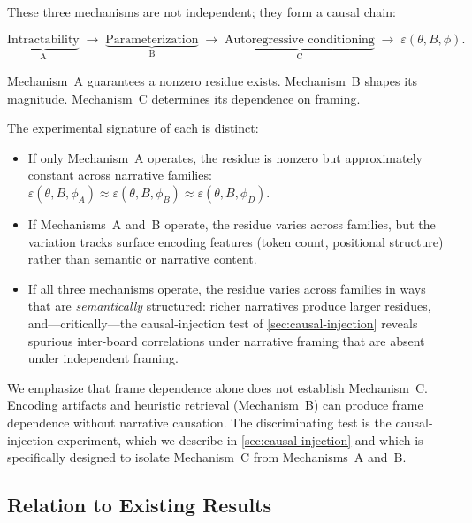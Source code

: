 \documentclass[12pt,a4paper]{article}
\theoremstyle{definition}
\theoremstyle{remark}
\begin{document}
These three mechanisms are not independent; they form a causal chain:

\begin{equation}\label{eq:causal-chain}
  \underbrace{\text{Intractability}}_{\text{A}}
  \;\longrightarrow\;
  \underbrace{\text{Parameterization}}_{\text{B}}
  \;\longrightarrow\;
  \underbrace{\text{Autoregressive conditioning}}_{\text{C}}
  \;\longrightarrow\;
  \varepsilon(\theta, B, \phi).
\end{equation}

Mechanism~A guarantees a nonzero residue exists.  Mechanism~B shapes
its magnitude.  Mechanism~C determines its dependence on framing.

The experimental signature of each is distinct:

\begin{itemize}
  \item If only Mechanism~A operates, the residue is nonzero but
    approximately constant across narrative families:
    $\varepsilon(\theta, B, \phi_A) \approx
     \varepsilon(\theta, B, \phi_B) \approx
     \varepsilon(\theta, B, \phi_D)$.

  \item If Mechanisms~A and~B operate, the residue varies across
    families, but the variation tracks surface encoding features
    (token count, positional structure) rather than semantic or
    narrative content.

  \item If all three mechanisms operate, the residue varies across
    families in ways that are \emph{semantically} structured: richer
    narratives produce larger residues, and---critically---the
    causal-injection test of \cref{sec:causal-injection} reveals
    spurious inter-board correlations under narrative framing that
    are absent under independent framing.
\end{itemize}

We emphasize that frame dependence alone does not establish
Mechanism~C.  Encoding artifacts and heuristic retrieval
(Mechanism~B) can produce frame dependence without narrative causation.
The discriminating test is the causal-injection experiment, which we
describe in \cref{sec:causal-injection} and which is specifically
designed to isolate Mechanism~C from Mechanisms~A and~B.

\subsection{Relation to Existing Results}
\end{document}
